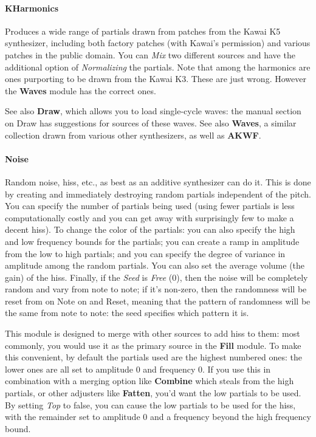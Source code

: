 \documentclass{article}
\begin{document}
\paragraph{KHarmonics}  Produces a wide range of partials drawn from patches from the Kawai K5 synthesizer, including both factory patches (with Kawai's permission) and various patches in the public domain.  You can {\it Mix} two different sources and have the additional option of {\it Normalizing} the partials.  Note that among the harmonics are ones purporting to be drawn from the Kawai K3.  These are just wrong.  However the {\bf Waves} module has the correct ones.

See also {\bf Draw}, which allows you to load single-cycle waves: the manual section on Draw has suggestions for sources of these waves.  See also {\bf Waves}, a similar collection drawn from various other synthesizers, as well as {\bf AKWF}.



\paragraph{Noise}  Random noise, hiss, etc., as best as an additive synthesizer can do it.  This is done by creating and immediately destroying random partials independent of the pitch.  You can specify the number of partials being used (using fewer partials is less computationally costly and you can get away with surprisingly few to make a decent hiss).   To change the color of the partials: you can also specify the high and low frequency bounds for the partials; you can create a ramp in amplitude from the low to high partials; and you can specify the degree of variance in amplitude among the random partials.  You can also set the average volume (the gain) of the hiss.  Finally, if the {\it Seed} is {\it Free} (0), then the noise will be completely random and vary from note to note; if it's non-zero, then the randomness will be reset from on Note on and Reset, meaning that the pattern of randomness will be the same from note to note: the seed specifies which pattern it is.

This module is designed to merge with other sources to add hiss to them: most commonly, you would use it as the primary source in the {\bf Fill} module.  To make this convenient, by default the partials used are the highest numbered ones: the lower ones are all set to amplitude 0 and frequency 0.  If you use this in combination with a merging option like {\bf Combine} which steals from the high partials, or other adjusters like {\bf Fatten}, you'd want the low partials to be used.  By setting {\it Top} to false, you can cause the low partials to be used for the hiss, with the remainder set to amplitude 0 and a frequency beyond the high frequency bound.  
\end{document}
